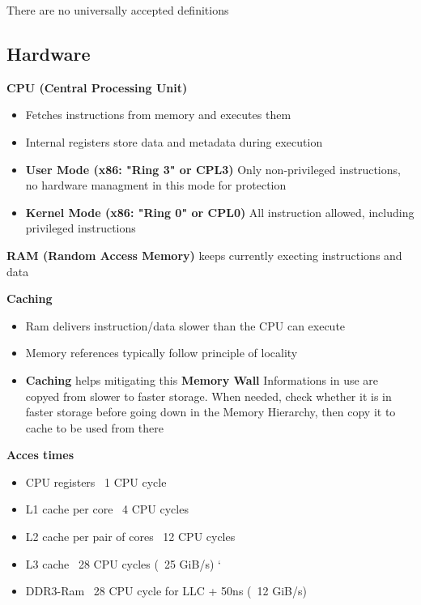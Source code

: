 \documentclass[11pt,a4paper]{article}
\begin{document}
	There are no universally accepted definitions
	
	\subsection{Hardware}
	
	\textbf{CPU (Central Processing Unit)}
	
	\begin{itemize}
		\item Fetches instructions from memory and executes them
		\item Internal registers store data and metadata during execution
		\item \textbf{User Mode (x86: "Ring 3" or CPL3)} \newline
		Only non-privileged instructions, no hardware managment in this mode for protection
		\item \textbf{Kernel Mode (x86: "Ring 0" or CPL0)} \newline
		All instruction allowed, including privileged instructions \newline
	\end{itemize}
	
	\textbf{RAM (Random Access Memory)} keeps currently execting instructions and data \newline
	
	\textbf{Caching}
	\begin{itemize}
		\item Ram delivers instruction/data slower than the CPU can execute
		\item Memory references typically follow principle of locality
		\item \textbf{Caching} helps mitigating this \textbf{Memory Wall} \newline
		Informations in use are copyed from slower to faster storage. When needed, check whether it is in faster storage before going down in the Memory Hierarchy, then copy it to cache to be used from there
	\end{itemize}
	
	\textbf{Acces times}
	\begin{itemize}
		\item CPU registers					\tab ~1 CPU cycle
		\item L1 cache per core 			\tab ~4 CPU cycles
		\item L2 cache per pair of cores	\tab ~12 CPU cycles
		\item L3 cache						\tab ~28 CPU cycles (~25 GiB/s)
`		\item DDR3-Ram						\tab ~28 CPU cycle for LLC + 50ns (~12 GiB/s)
	\end{itemize}
\end{document}
